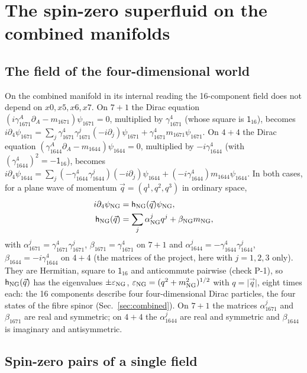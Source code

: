 \section{The spin-zero superfluid on the combined manifolds}
\label{sec:superfluid}

\subsection{The field of the four-dimensional world}

On the combined manifold in its internal reading the 16-component field does not depend on
$x0,x5,x6,x7$. On $7+1$ the Dirac equation $(i\gamma^A_{1671}\partial_A-m_{1671})\psi_{1671}=0$, multiplied
by $\gamma^4_{1671}$ (whose square is $\mathsf 1_{16}$), becomes $i\partial_4\psi_{1671}=\sum_j\gamma^4_{1671}
\gamma^j_{1671}(-i\partial_j)\psi_{1671}+\gamma^4_{1671}m_{1671}\psi_{1671}$. On $4+4$ the Dirac equation
$(\gamma^A_{1644}\partial_A-m_{1644})\psi_{1644}=0$, multiplied by $-i\gamma^4_{1644}$ (with
$(\gamma^4_{1644})^2=-\mathsf 1_{16}$), becomes $i\partial_4\psi_{1644}=\sum_j(-\gamma^4_{1644}\gamma^j_{1644})
(-i\partial_j)\psi_{1644}+(-i\gamma^4_{1644})m_{1644}\psi_{1644}$. In both cases, for a plane wave of
momentum $\vec q=(q^1,q^2,q^3)$ in ordinary space,
\begin{align}
i\partial_4\psi_{\rm NG}&=\mathsf h_{\rm NG}(\vec q)\psi_{\rm NG},\nonumber\\
\mathsf h_{\rm NG}(\vec q)&=\sum_j\alpha^j_{\rm NG}q^j+\beta_{\rm NG}m_{\rm NG},
\label{eq:h4d}
\end{align}
with $\alpha^j_{1671}=\gamma^4_{1671}\gamma^j_{1671}$, $\beta_{1671}=\gamma^4_{1671}$ on $7+1$ and
$\alpha^j_{1644}=-\gamma^4_{1644}\gamma^j_{1644}$, $\beta_{1644}=-i\gamma^4_{1644}$ on $4+4$ (the matrices
of the project, here with $j=1,2,3$ only). They are Hermitian, square to $\mathsf 1_{16}$ and anticommute
pairwise (check P-1), so $\mathsf h_{\rm NG}(\vec q)$ has the eigenvalues $\pm\varepsilon_{\rm NG}$,
$\varepsilon_{\rm NG}=(q^2+m^2_{\rm NG})^{1/2}$ with $q=\lvert\vec q\rvert$, eight times each: the 16
components describe four four-dimensional Dirac particles, the four states of the fibre spinor
(Sec.~\ref{sec:combined}). On $7+1$ the matrices $\alpha^j_{1671}$ and $\beta_{1671}$ are real and
symmetric; on $4+4$ the $\alpha^j_{1644}$ are real and symmetric and $\beta_{1644}$ is imaginary and
antisymmetric.

\subsection{Spin-zero pairs of a single field}

